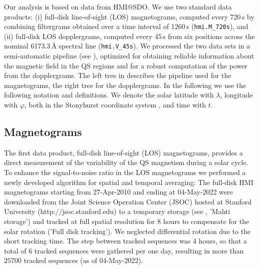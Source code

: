\documentclass{aa}
\begin{document}
Our analysis is based on data from HMI@SDO. We use two standard data products: (i) full-disk line-of-sight (LOS) magnetograms, computed every 720\,s by combining filtergrams obtained over a time interval of 1260\,s (\texttt{hmi.M\_720s}), and (ii) full-disk LOS dopplergrams, computed every 45\,s from six positions across the nominal 6173.3\,\AA{} spectral line (\texttt{hmi.V\_45s}). We processed the two data sets in a semi-automatic pipeline (see ), optimized for obtaining reliable information about the magnetic field in the QS regions and for a robust computation of the \fff power from the dopplergrams. The left tree in  describes the pipeline used for the magnetograms, the right tree for the dopplergrams.
In the following we use the following notation and definitions. 
We denote the solar 
latitude with $\lambda$, longitude with $\varphi$, 
both in the Stonyhurst coordinate system \cite[]{Thomson06}, 
and time with $t$. 



\subsection{Magnetograms}

The first data product, full-disk line-of-sight (LOS) magnetograms, provides a direct measurement of the variability of the QS
magnetism during a solar cycle. To enhance the signal-to-noise ratio in the LOS magnetograms we performed a newly developed algorithm for spatial and temporal averaging: The full-disk HMI magnetograms starting from 27-Apr-2010 and ending at 
04-May-2022
were downloaded from the Joint Science Operation Center (JSOC) hosted at Stanford University (http://jsoc.stanford.edu) to a temporary storage (see , 'Mahti storage') and tracked at full spatial resolution for 8 hours to compensate for the solar rotation ('Full disk tracking').
We neglected differential rotation due to
the short tracking time.
The step between tracked sequences was 4 hours, so that a total of 6 tracked sequences were gathered per one day, resulting in more than 
$25700$ tracked sequences (as of 04-May-2022).
\end{document}
